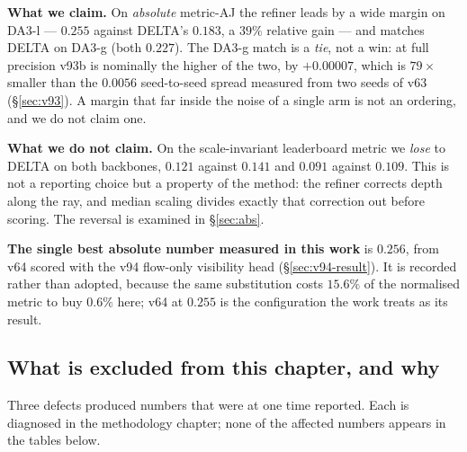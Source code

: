 \documentclass[11pt,a4paper]{article}
\begin{document}
\textbf{What we claim.} On \emph{absolute} metric-AJ the refiner leads by a wide margin on DA3-l
--- $0.255$ against DELTA's $0.183$, a $39\%$ relative gain --- and matches DELTA on DA3-g
(both $0.227$). The DA3-g match is a \emph{tie}, not a win: at full precision v93b is nominally the
higher of the two, by $+0.00007$, which is $79\times$ smaller than the $0.0056$ seed-to-seed
spread measured from two seeds of v63 (\S\ref{sec:v93}). A margin that far inside the noise of a
single arm is not an ordering, and we do not claim one.

\textbf{What we do not claim.} On the scale-invariant leaderboard metric we \emph{lose} to DELTA
on both backbones, $0.121$ against $0.141$ and $0.091$ against $0.109$. This is not a
reporting choice but a property of the method: the refiner corrects depth along the ray, and
median scaling divides exactly that correction out before scoring. The reversal is examined in
\S\ref{sec:abs}.

\textbf{The single best absolute number measured in this work} is $0.256$, from v64 scored with
the v94 flow-only visibility head (\S\ref{sec:v94-result}). It is recorded rather than adopted,
because the same substitution costs $15.6\%$ of the normalised metric to buy $0.6\%$ here; v64 at
$0.255$ is the configuration the work treats as its result.

\subsection{What is excluded from this chapter, and why}
\label{sec:final-excluded}

Three defects produced numbers that were at one time reported. Each is diagnosed in the
methodology chapter; none of the affected numbers appears in the tables below.
\end{document}
